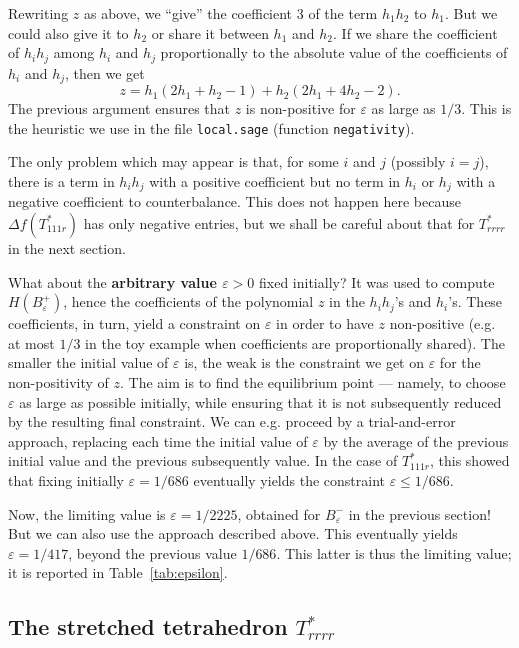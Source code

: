 \documentclass[11pt]{article}
\begin{document}
Rewriting $z$ as above, we ``give'' the coefficient $3$ of the term $h_1h_2$ to $h_1$.
But we could also give it to $h_2$ or share it between $h_1$ and $h_2$.
If we share the coefficient of $h_ih_j$ among $h_i$ and $h_j$ proportionally to the absolute value of the coefficients of $h_i$ and $h_j$, then we get
\[
z=h_1(2h_1+h_2-1)+h_2(2h_1+4h_2-2).
\]
The previous argument ensures that $z$ is non-positive for $\varepsilon$ as large as $1/3$.
This is the heuristic we use in the file \verb+local.sage+ (function \verb+negativity+).

The only problem which may appear is that, for some $i$ and $j$ (possibly $i=j$), there is a term in $h_ih_j$ with a positive coefficient but no term in $h_i$ or $h_j$ with a negative coefficient to counterbalance.
This does not happen here because $\Delta f(T_{111r}^*)$ has only negative entries, but we shall be careful about that for $T_{rrrr}^*$ in the next section.

What about the {\bf arbitrary value $\varepsilon>0$} fixed initially?
It was used to compute $H(B^+_\varepsilon)$, hence the coefficients of the polynomial $z$ in the $h_ih_j$'s and $h_i$'s.
These coefficients, in turn, yield a constraint on $\varepsilon$ in order to have $z$ non-positive (e.g. at most $1/3$ in the toy example when coefficients are proportionally shared).
The smaller the initial value of $\varepsilon$ is, the weak is the constraint we get on $\varepsilon$ for the non-positivity of $z$.
The aim is to find the equilibrium point — namely, to choose $\varepsilon$ as large as possible initially, while ensuring that it is not subsequently reduced by the resulting final constraint.
We can e.g. proceed by a trial-and-error approach, replacing each time the initial value of $\varepsilon$ by the average of the previous initial value and the previous subsequently value. 
In the case of $T_{111r}^*$, this showed that fixing initially $\varepsilon=1/686$ eventually yields the constraint $\varepsilon\leq 1/686$.

Now, the limiting value is $\varepsilon=1/2225$, obtained for $B_\varepsilon^-$ in the previous section!
But we can also use the approach described above.
This eventually yields $\varepsilon=1/417$, beyond the previous value $1/686$.
This latter is thus the limiting value; it is reported in Table~\ref{tab:epsilon}.



\subsection{The stretched tetrahedron $T_{rrrr}^*$}
\label{sec:Trrrr}
\end{document}

